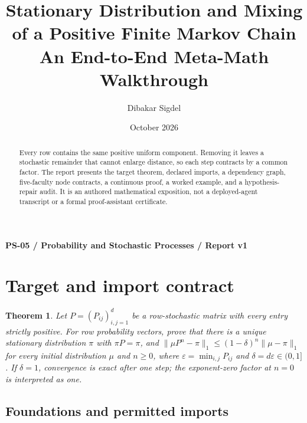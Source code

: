 \documentclass[preprint,12pt,aps,pra,showkeys,amsmath,amssymb,superscriptaddress,floatfix]{revtex4-2}
\newtheorem{theorem}{Theorem}[section]
\theoremstyle{definition}
\theoremstyle{remark}
\begin{document}
\title{Stationary Distribution and Mixing of a Positive Finite Markov Chain\\[4pt]\large An End-to-End Meta-Math Walkthrough}

\author{Dibakar Sigdel}


\date{October 2026}

\begin{abstract}

Every row contains the same positive uniform component. Removing it
leaves a stochastic remainder that cannot enlarge distance, so each step
contracts by a common factor. The report presents the target theorem,
declared imports, a dependency graph, five-faculty node contracts, a
continuous proof, a worked example, and a hypothesis-repair audit. It is
an authored mathematical exposition, not a deployed-agent transcript or
a formal proof-assistant certificate.

\end{abstract}\maketitle\linespread{1.12}\selectfont

\noindent\textbf{PS-05 / Probability and Stochastic Processes / Report v1}

\section{Target and import contract}

\begin{theorem}

Let \(P=(P_{ij})_{i,j=1}^d\) be a row-stochastic matrix with every entry
strictly positive. For row probability vectors, prove that there is a
unique stationary distribution \(\pi\) with \(\pi P=\pi\), and
\(\|\mu P^n-\pi\|_1\le(1-\delta)^n\|\mu-\pi\|_1\) for every initial
distribution \(\mu\) and \(n\ge0\), where
\(\varepsilon=\min_{i,j}P_{ij}\) and \(\delta=d\varepsilon\in(0,1]\). If
\(\delta=1\), convergence is exact after one step; the exponent-zero
factor at \(n=0\) is interpreted as one.

\end{theorem}

\subsection{Foundations and permitted imports}
\end{document}
